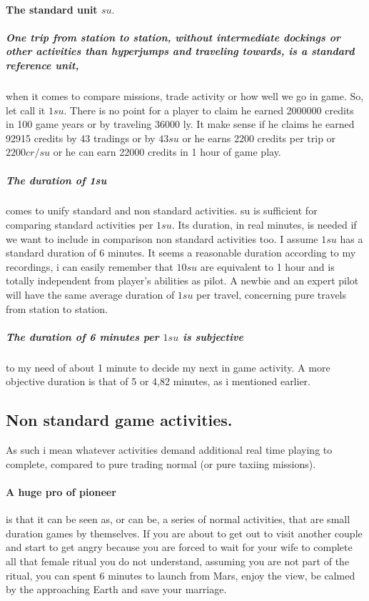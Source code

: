 \documentclass[]{article}
\begin{document}
\paragraph{The standard unit $su.$}\label{standard_unit}
\subparagraph*{One trip from station to station, without intermediate dockings or other activities than hyperjumps and traveling towards, is a standard reference unit,} when it comes to compare missions, trade activity or how well we go in game. So, let call it $ 1su $. There is no  point for a player to claim he earned 2000000 credits in 100 game years or by traveling 36000 ly. It make sense if he claims he earned 92915 credits by 43 tradings or by $ 43 su $ or he earns 2200 credits per trip or $ 2200cr/su $ or he can earn 22000 credits in 1 hour of game play.
\subparagraph{The duration of 1su} comes to unify standard and non standard activities. su is sufficient for comparing standard activities per $1 su.$ Its duration, in real minutes, is needed if we want to include in comparison non standard activities too. I assume $ 1su $ has a standard duration of 6 minutes. It seems a reasonable duration according to my recordings, i can easily remember that $ 10su $ are equivalent to 1 hour and is totally independent from player's abilities as pilot. A newbie and an expert pilot will have the same average duration of $ 1su $ per travel, concerning pure travels from station to station.
\subparagraph{The duration of 6 minutes per $1su$ is subjective} to my need of about 1 minute to decide my next in game activity. A more objective duration is that of 5 or 4,82 minutes, as i mentioned earlier.

\subsection{Non standard game activities.}

As such i mean whatever activities demand additional real time playing to complete, compared to pure trading  normal (or pure taxiing missions).  
\paragraph{A huge pro of pioneer} is that it can be seen as, or can be,  a series of normal activities, that are small duration games by themselves. If you are about to get out to visit another couple and start to get angry because you are forced to wait for your wife to complete all that female ritual you do not understand, assuming you are not part of the ritual, you can spent 6 minutes to launch from Mars, enjoy the view, be calmed by the approaching Earth and save your marriage.
\end{document}
